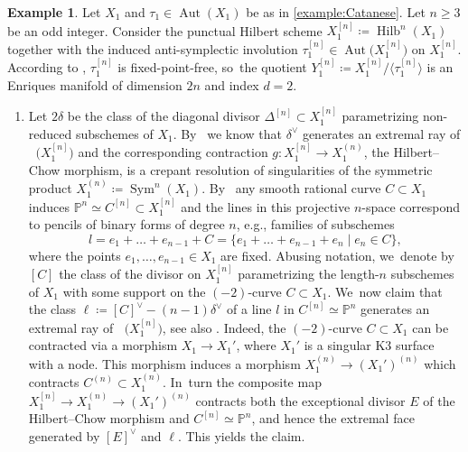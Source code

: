\documentclass[10pt]{amsart}
\newenvironment{enumeratea}
{\bgroup\def\theenumi{\alph{enumi}}\begin{enumerate}}
{\end{enumerate}\egroup}
\renewcommand\theenumi{\roman{enumi}}
\theoremstyle{plain}
\theoremstyle{definition}
\newtheorem{exa}[thm]{Example}
\renewcommand{\P}{\mathbb{P}}
\DeclareMathOperator{\Aut}{Aut}
\DeclareMathOperator{\Hilb}{Hilb}
\DeclareMathOperator{\Sym}{Sym}
\DeclareMathOperator{\NEb}{\overline{\mathrm{NE}}}
\begin{document}
\begin{exa}
\label{example:PEV_from_Catanese}
Let $X_1$ and $\tau_1 \in \Aut(X_1)$ be as in \autoref{example:Catanese}. Let $n \geq 3$ be an odd integer. Consider the punctual Hilbert scheme $X_1^{[n]} \coloneqq \Hilb^n(X_1)$ together with the induced anti-symplectic involution $ \tau_1^{[n]} \in \Aut \bigl(X_1^{[n]} \bigr)$ on $X_1^{[n]}$. According to \cite[Prop.\,4.1]{OS11a}, $\tau_1^{[n]}$ is fixed-point-free, so~the quotient $Y_1^{[n]} \coloneqq X_1^{[n]} / \langle \tau_1^{[n]} \rangle$ is an Enriques manifold of dimension $2n$ and index $d=2$.

\begin{enumeratea}
\item\label{example:PEV_from_Catanesea}
Let $2\delta$ be the class of the diagonal divisor $\Delta^{[n]}\subset X_1^{[n]}$ parametrizing non-reduced subschemes of $X_1$. By~\cite[Ex.\,4.2]{HT10b} we know that $\delta^\vee$ generates an extremal ray of $\NEb \bigl(X_1^{[n]} \bigr)$ and the corresponding contraction $g \colon X_1^{[n]} \to X_1^{(n)}$, the Hilbert--Chow morphism, is a crepant resolution of singularities of the symmetric product $X_1^{(n)} \coloneqq \Sym^n(X_1)$. By~\cite[Ex.\,4.11]{HT10b} any smooth rational curve $C \subset X_1$ induces $\mathbb{P}^n \simeq C^{[n]} \subset X_1^{[n]}$ and the lines in this projective $n$-space correspond to pencils of binary forms of degree $n$, e.g., families of subschemes
\[
l = e_1 + \ldots + e_{n-1} + C =
\{e_1 + \ldots + e_{n-1} + e_n \mid e_n \in C \},
\]
where the points $e_1, \dots, e_{n-1} \in X_1$ are fixed. Abusing notation, we~denote by $[C]$ the class of the divisor on $X_1^{[n]}$ parametrizing the length-$n$ subschemes of $X_1$ with some support on the $(-2)$-curve $C \subset X_1$. We~now claim that the class $\ell \coloneqq [C]^{\vee} - (n-1)\delta^\vee$ of a line $l$ in $C^{[n]}\simeq \P^n$ generates an extremal ray of $\NEb \bigl(X_1^{[n]} \bigr)$, see also \cite[Ex.\,4.7]{HT10b}. Indeed, the $(-2)$-curve $C \subset X_1$ can be contracted via a morphism $X_1 \to X_1'$, where $X_1'$ is a singular K3 surface with a node. This morphism induces a morphism $X_1^{(n)} \to (X_1')^{(n)}$ which contracts $C^{(n)} \subset X_1^{(n)}$. In~turn the composite map $X_1^{[n]} \to X_1^{(n)} \to (X_1')^{(n)}$ contracts both the exceptional divisor $E$ of the Hilbert--Chow morphism and $C^{[n]} \simeq \P^n$, and hence the extremal face generated by $[E]^{\vee}$ and $\ell$. This yields the claim.


\end{enumeratea}
\end{exa}
\end{document}
